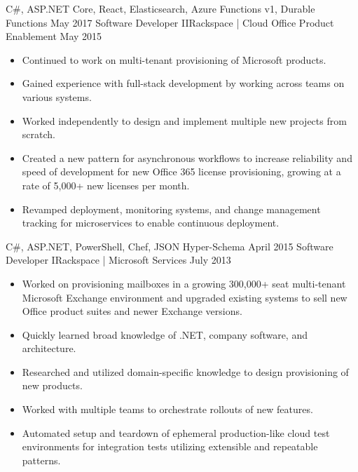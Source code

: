 \begin{experiences}
{\begin{itemize}
                      \end{itemize}
                    }
                    {C\#, ASP.NET Core, React, Elasticsearch, Azure Functions v1, Durable Functions}
\ifcv
  \emptySeparator
  \experience
    {May 2017}     {Software Developer II}{Rackspace | Cloud Office Product Enablement}
    {May 2015}     {
                      \begin{itemize}
                        \item Continued to work on multi-tenant provisioning of Microsoft products.
                        \item Gained experience with full-stack development by working across teams on various systems.
                        \item Worked independently to design and implement multiple new projects from scratch.
                        \item Created a new pattern for asynchronous workflows to increase reliability and speed of development for new Office 365 license provisioning, growing at a rate of 5,000+ new licenses per month.
                        \item Revamped deployment, monitoring systems, and change management tracking for microservices to enable continuous deployment.
                      \end{itemize}
                    }
                    {C\#, ASP.NET, PowerShell, Chef, JSON Hyper-Schema}
\fi
  \emptySeparator
  \experience
  {April 2015}       {Software Developer I}{Rackspace | Microsoft Services}
  {July 2013}        {
                      \begin{itemize}
                        \item Worked on provisioning mailboxes in a growing 300,000+ seat multi-tenant Microsoft Exchange environment and upgraded existing systems to sell new Office product suites and newer Exchange versions.
                        \item Quickly learned broad knowledge of .NET, company software, and architecture.
                        \item Researched and utilized domain-specific knowledge to design provisioning of new products.
                        \ifcv
                        \item Worked with multiple teams to orchestrate rollouts of new features.
                        \item Automated setup and teardown of ephemeral production-like cloud test environments for integration tests utilizing extensible and repeatable patterns.

\end{itemize}}
\end{experiences}
